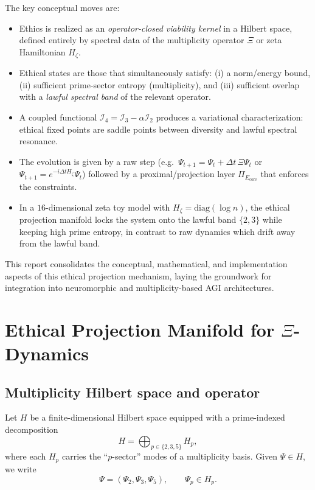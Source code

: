 \documentclass[11pt]{article}
\begin{document}
The key conceptual moves are:
\begin{itemize}[leftmargin=*]
  \item Ethics is realized as an \emph{operator-closed viability kernel} in a Hilbert space,
        defined entirely by spectral data of the multiplicity operator $\Xi$ or zeta Hamiltonian $H_\zeta$.
  \item Ethical states are those that simultaneously satisfy:
        (i) a norm/energy bound, (ii) sufficient prime-sector entropy (multiplicity),
        and (iii) sufficient overlap with a \emph{lawful spectral band} of the relevant operator.
  \item A coupled functional $\mathcal{I}_4 = \mathcal{I}_3 - \alpha \mathcal{I}_2$ produces
        a variational characterization: ethical fixed points are saddle points between diversity
        and lawful spectral resonance.
  \item The evolution is given by a raw step (e.g.\ $\Psi_{t+1} = \Psi_t + \Delta t\,\Xi\Psi_t$ or
        $\Psi_{t+1} = e^{-i\Delta t H_\zeta}\Psi_t$) followed by a proximal/projection layer
        $\Pi_{E_{\mathrm{core}}}$ that enforces the constraints.
  \item In a $16$-dimensional zeta toy model with $H_\zeta = \mathrm{diag}(\log n)$,
        the ethical projection manifold locks the system onto the lawful band $\{2,3\}$ while keeping
        high prime entropy, in contrast to raw dynamics which drift away from the lawful band.
\end{itemize}

This report consolidates the conceptual, mathematical, and implementation aspects of this
ethical projection mechanism, laying the groundwork for integration into neuromorphic and
multiplicity-based AGI architectures.

\section{Ethical Projection Manifold for $\Xi$-Dynamics}

\subsection{Multiplicity Hilbert space and operator}

Let $H$ be a finite-dimensional Hilbert space equipped with a prime-indexed decomposition
\[
  H = \bigoplus_{p\in\{2,3,5\}} H_p,
\]
where each $H_p$ carries the ``$p$-sector'' modes of a multiplicity basis.
Given $\Psi\in H$, we write
\[
  \Psi = (\Psi_2,\Psi_3,\Psi_5),
  \qquad \Psi_p \in H_p.
\]
\end{document}
